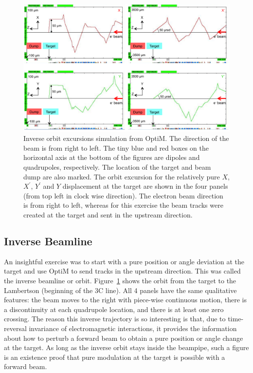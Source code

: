 \begin{singlespace}
\begin{figure}[!h]
	\begin{center}
	\includegraphics[width=15.0cm]{figures/BModInverseBeamline}
	\end{center}
	\caption
	{Inverse orbit excursions simulation from OptiM. The direction of the beam is from right to left. The tiny blue and red boxes on the horizontal axis at the bottom of the figures are dipoles and quadrupoles, respectively. The location of the target and beam dump are also marked. The orbit excursion for the relatively pure $X$, $X^{\prime}$, $Y^{\prime}$ and $Y$ displacement at the target are shown in the four panels (from top left in clock wise direction). The electron beam direction is from right to left, whereas for this exercise the beam tracks were created at the target and sent in the upstream direction.}
	\label{fig:BModInverseBeamline}
\end{figure}
\end{singlespace}

\subsection{Inverse Beamline}
\label{Inverse Beamline}
An insightful exercise was to start with a pure position or angle deviation at the target and use OptiM to send tracks in the upstream direction. This was called the inverse beamline or orbit. Figure~\ref{fig:BModInverseBeamline} shows the orbit from the target to the Lambertson (beginning of the 3C line). All 4 panels have the same qualitative features: the beam moves to the right with piece-wise continuous motion, there is a discontinuity at each quadrupole location, and there is at least one zero crossing. The reason this inverse trajectory is so interesting is that, due to time-reversal invariance of electromagnetic interactions, it provides the information about how to perturb a forward beam to obtain a pure position or angle change at the target. As long as the inverse orbit stays inside the beampipe, such a figure is an existence proof that pure modulation at the target is possible with a forward beam. 


